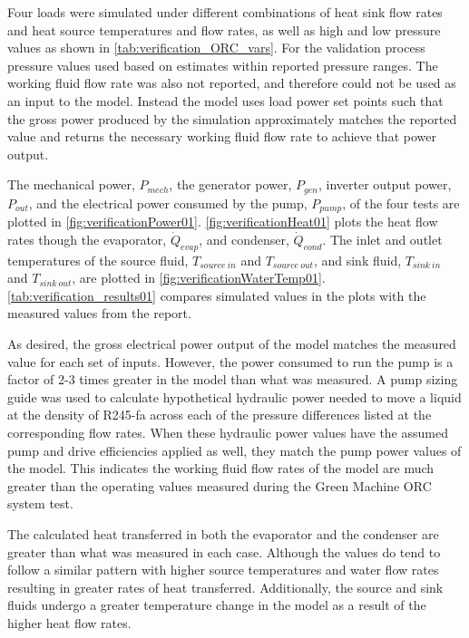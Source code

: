 Four loads were simulated under different combinations of heat sink flow rates and heat source temperatures and flow rates, as well as high and low pressure values as shown in  \autoref{tab:verification_ORC_vars}. For the validation process pressure values used based on estimates within reported pressure ranges. The working fluid flow rate was also not reported, and therefore could not be used as an input to the model. Instead the model uses load power set points such that the gross power produced by the simulation approximately matches the reported value and returns the necessary working fluid flow rate to achieve that power output.  


The mechanical power, $P_{mech}$, the generator power, $P_{gen}$, inverter output power, $P_{out}$, and the electrical power consumed by the pump, $P_{pump}$, of the four tests are plotted in \autoref{fig:verificationPower01}.  
\autoref{fig:verificationHeat01}  
plots the heat flow rates though the evaporator, $\dot{Q}_{evap}$, and condenser,  $\dot{Q}_{cond}$. The inlet and outlet temperatures of the source fluid, $T_{source\ in}$ and $T_{source\ out}$, and sink fluid, $T_{sink\ in}$ and $T_{sink\ out}$, are plotted in \autoref{fig:verificationWaterTemp01}.  
\autoref{tab:verification_results01} compares simulated values in the plots with the measured values from the report.


As desired, the gross electrical power output of the model matches the measured value for each set of inputs. However, the power consumed to run the pump is a factor of 2-3 times greater in the model than what was measured. A pump sizing guide \cite{CheGuide2017} was used to calculate hypothetical hydraulic power needed to move a liquid at the density of R245-fa across each of the pressure differences listed at the corresponding flow rates. When these hydraulic power values have the assumed pump and drive efficiencies applied as well, they match the pump power values of the model. This indicates the working fluid flow rates of the model are much greater than the operating values measured during the Green Machine ORC system test.

The calculated heat transferred in both the evaporator and the condenser are greater than what was measured in each case. Although the values do tend to follow a similar pattern with higher source temperatures and water flow rates resulting in greater rates of heat transferred. Additionally, the source and sink fluids undergo a greater temperature change in the model as a result of the higher heat flow rates.


